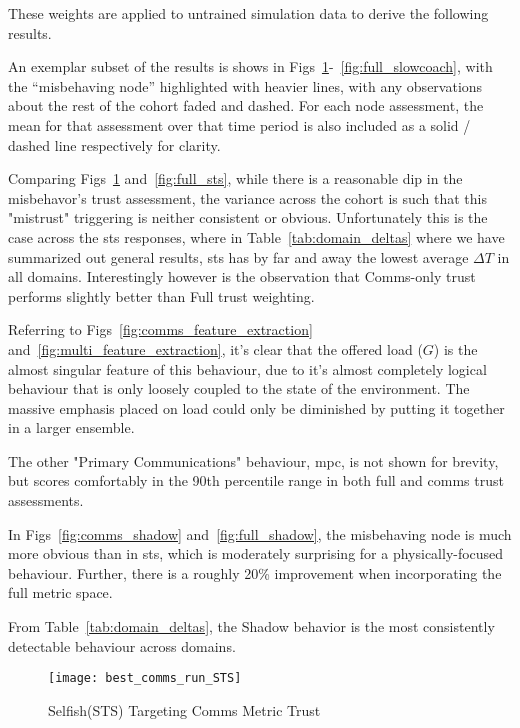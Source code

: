These weights are applied to untrained simulation data to derive the following results.

An exemplar subset of the results is shows in Figs~\ref{fig:comms_sts}-~\ref{fig:full_slowcoach}, with the ``misbehaving node'' highlighted with heavier lines, with any observations about the rest of the cohort faded and dashed. For each node assessment, the mean for that assessment over that time period is also included as a solid / dashed line respectively for clarity.

Comparing Figs~\ref{fig:comms_sts} and~\ref{fig:full_sts}, while there is a reasonable dip in the misbehavor's trust assessment, the variance across the cohort is such that this "mistrust" triggering is neither consistent or obvious. Unfortunately this is the case across the \gls{sts} responses, where in Table~\ref{tab:domain_deltas} where we have summarized out general results, \gls{sts} has by far and away the lowest average $\Delta T$ in all domains. Interestingly however is the observation that Comms-only trust performs slightly better than Full trust weighting.

Referring to Figs~\ref{fig:comms_feature_extraction} and~\autoref{fig:multi_feature_extraction}, it's clear that the offered load ($G$) is the almost singular feature of this behaviour, due to it's almost completely logical behaviour that is only loosely coupled to the state of the environment. 
The massive emphasis placed on load could only be diminished by putting it together in a larger ensemble.

The other "Primary Communications" behaviour, \gls{mpc}, is not shown for brevity, but scores comfortably in the 90th percentile range in both full and comms trust assessments.

In Figs~\ref{fig:comms_shadow} and~\ref{fig:full_shadow}, the misbehaving node is much more obvious than in \gls{sts}, which is moderately surprising for a physically-focused behaviour. Further, there is a roughly 20\% improvement when incorporating the full metric space.

From Table~\ref{tab:domain_deltas}, the Shadow behavior is the most consistently detectable behaviour across domains. 

\begin{figure}[h]
	\centering
	\texttt{[image: best\_comms\_run\_STS]}
	\caption{Selfish(STS) Targeting Comms Metric Trust}
	\label{fig:comms_sts}
\end{figure}

